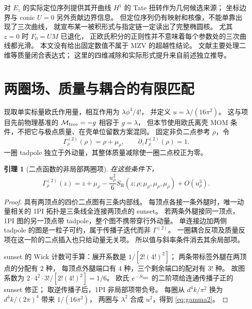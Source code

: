 \documentclass[11pt,a4paper]{ctexart}
\theoremstyle{cnplain}
\newtheorem{lemma}[theorem]{引理}
\theoremstyle{remark}\newtheorem{remark}[theorem]{注}
\newcommand{\SR}{S_{\mathrm R}}
\begin{document}
对 $E_z$ 的实际定位序列提供其开曲线 $H^1$ 的 Tate 扭转作为几何候选来源；
坐标边界与 conic $U=0$ 另外贡献边界信息。
但定位序列仍有映射和核像，不能单靠出现了三次曲线，
就宣布某一被积形式与指定链一定读出了完整椭圆核。
尤其 $z=0$ 时 $F_0=UM$ 已退化，
正欧氏积分的正则性并不意味着每个参数处的三次曲线都光滑。
本文没有给出固定数值不属于 MZV 的超越性结论。
文献\cite{BV}主要处理二维等质量闭合表达式；
这里的四维减除和实际形式提升来自前述独立推导。

\section{两圈场、质量与耦合的有限匹配}\label{sec:field}
现取单实标量欧氏作用量，相互作用为 $\lambda\phi^4/4!$，
并定义 $u=\lambda/(16\pi^2)$。
这与项目先前物理基准的 $\mathcal M_{\rm tree}=-g$ 相容于 $g=\lambda$，
但本节使用欧氏离壳 MOM 条件，不把它与极点质量、在壳单位留数方案混同。
固定非负二点参考 $\rho$，令
\begin{equation}\label{eq:2conditions}
 \Gamma^{(2)}_\rho(\rho)=\rho+\mu_\rho,
 \qquad \partial_z\Gamma^{(2)}_\rho(\rho)=1.
\end{equation}
一圈 tadpole 独立于外动量，其整体质量减除使一圈二点校正为零。

\begin{lemma}[二点函数的非局部两圈项]\label{lem:weight}
在这些条件下，
\begin{equation}\label{eq:gamma2}
 \Gamma^{(2)}_\rho(z)=z+\mu_\rho
       -\frac{u_\rho^2}{6}\SR(z;\rho;\mu_\rho,\mu_\rho,\mu_\rho)
       +O(u_\rho^3).
\end{equation}
\end{lemma}
\begin{proof}
具有两顶点的四价二点图有三条内部线。
每顶点各接一条外腿时，唯一动量相关的 1PI 拓扑是三条线全连接两顶点的 sunset。
若两条外腿接同一顶点，1PI 图的另一顶点带 tadpole，整个图不携带穿行外动量。
单连接边加两侧 tadpole 的图是一粒子可约，属于传播子迭代而非 $\Gamma^{(2)}$。
一圈耦合反项及质量反项在这一阶的二点插入也只给动量无关项。
所以值与斜率条件消去其余局部项。

sunset 的 Wick 计数可手算：展开系数是
$1/[2!(4!)^2]$；
两条带标签外腿在两顶点的分配有 $2$ 种，
每顶点外腿端口有 $4$ 种，三个剩余端口的配对有 $3!$ 种。
故图系数为 $2\cdot4^2\cdot3!/[2!(4!)^2]=1/6$。
欧氏 $e^{-S_{\rm int}}$ 的二阶项给连通传播子正的 sunset 修正；
取逆传播子后，1PI 非局部项带负号。
每圈从 $d^4k/\pi^2$ 换为 $d^4k/(2\pi)^4$ 带来 $1/(16\pi^2)$，
两圈与 $\lambda^2$ 合成 $u^2$，得到 \eqref{eq:gamma2}。
\end{proof}
\end{document}
